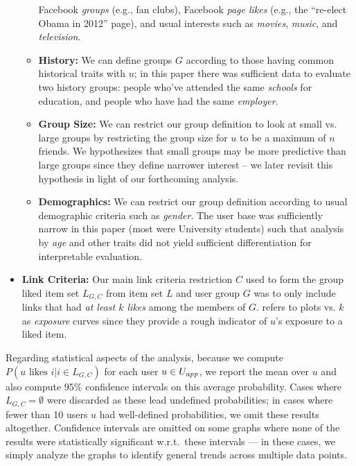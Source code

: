 \begin{itemize}
\begin{itemize}
      Facebook \textit{groups} (e.g., fan clubs), Facebook
      \textit{page likes} (e.g., the ``re-elect Obama in 2012'' page),
      and usual interests such as \textit{movies}, \textit{music}, and
      \textit{television}.
    \item \textbf{History:} We can define groups $G$ according to
      those having common historical traits with $u$; in this paper
      there was sufficient data to evaluate two history groups:
      people who've attended the same \textit{schools} for education,
      and people who have had the same \textit{employer}.
    \item \textbf{Group Size:} We can restrict our group definition
      to look at small vs. large groups by restricting the group
      size for $u$ to be a maximum of $n$ friends.  We hypothesizes
      that small groups may be more predictive than large groups since
      they define narrower interest -- we later revisit this hypothesis
      in light of our forthcoming analysis.
    \item \textbf{Demographics:} We can restrict our group definition
      according to usual demographic criteria such as \emph{gender}.
      The user base was sufficiently narrow in this paper (most were
      University students) such that analysis by \emph{age} and other
      traits did not yield sufficient differentiation for
      interpretable evaluation.%
  \end{itemize}
\item \textbf{Link Criteria:} Our main link criteria restriction $C$
      used to form the group liked item set $L_{G,C}$ from item set
      $L$ and user group $G$ was to only include links that had
      \emph{at least $k$ likes} among the members of $G$.  
      \cite{Romero2011hashtag} refers to plots vs. $k$ as
      \emph{exposure} curves since they provide a rough indicator of
      $u$'s exposure to a liked item.
\end{itemize}

Regarding statistical aspects of the analysis, 
because we compute $P(u \mbox{ likes } i | i \in L_{G,C})$ for each
user $u \in U_{\mathit{app}}$, we report the mean over $u$ and also compute 95\%
confidence intervals on this average probability.  Cases where
$L_{G,C} = \emptyset$ were discarded as these lead undefined
probabilities; in cases where fewer than 10 users $u$ had well-defined
probabilities, we omit these results altogether.  Confidence intervals
are omitted on some graphs where none of the results were
statistically significant w.r.t.\ these intervals --- in these cases,
we simply analyze the graphs to identify general trends across
multiple data points.

